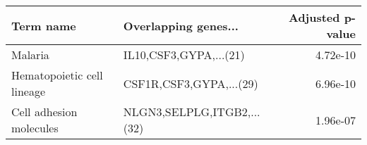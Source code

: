\begin{tabular}{llr}
\toprule
                 Term name &       Overlapping genes... &  Adjusted p-value \\
\midrule
                   Malaria &     IL10,CSF3,GYPA,...(21) &          4.72e-10 \\
Hematopoietic cell lineage &    CSF1R,CSF3,GYPA,...(29) &          6.96e-10 \\
   Cell adhesion molecules & NLGN3,SELPLG,ITGB2,...(32) &          1.96e-07 \\
\bottomrule
\end{tabular}
